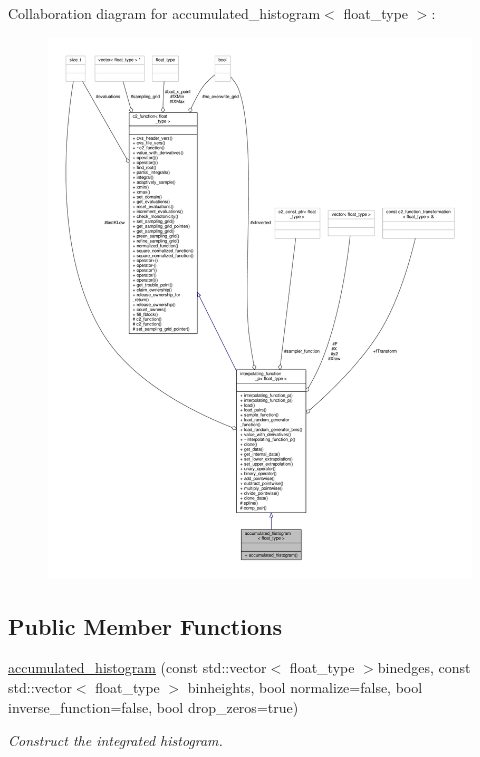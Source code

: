 Collaboration diagram for accumulated\+\_\+histogram$<$ float\+\_\+type $>$\+:
\nopagebreak
\begin{figure}[H]
\begin{center}
\leavevmode
\includegraphics[width=350pt]{classaccumulated__histogram__coll__graph}
\end{center}
\end{figure}
\subsection*{Public Member Functions}
\begin{DoxyCompactItemize}
\item 
\hyperlink{classaccumulated__histogram_a54f0bb356a90baa58ff635ef8094dfc8}{accumulated\+\_\+histogram} (const std\+::vector$<$ float\+\_\+type $>$binedges, const std\+::vector$<$ float\+\_\+type $>$ binheights, bool normalize=false, bool inverse\+\_\+function=false, bool drop\+\_\+zeros=true)
\begin{DoxyCompactList}\small\item\em Construct the integrated histogram. \end{DoxyCompactList}\end{DoxyCompactItemize}
